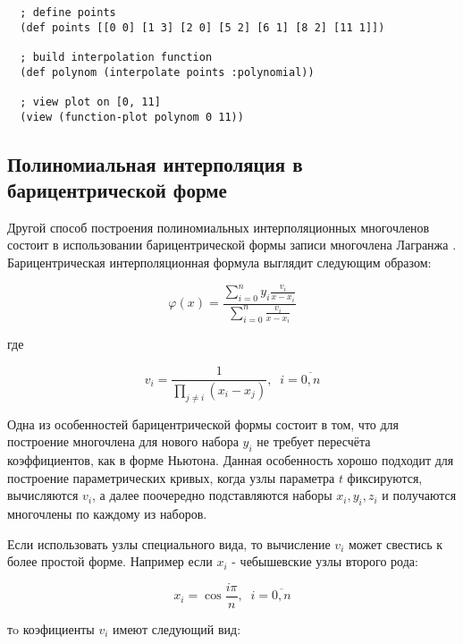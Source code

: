 \begin{verbatim}
  ; define points
  (def points [[0 0] [1 3] [2 0] [5 2] [6 1] [8 2] [11 1]])

  ; build interpolation function
  (def polynom (interpolate points :polynomial))

  ; view plot on [0, 11]
  (view (function-plot polynom 0 11))
\end{verbatim}




\subsection{Полиномиальная интерполяция в барицентрической форме}

Другой способ построения полиномиальных интерполяционных многочленов состоит в использовании барицентрической формы записи многочлена Лагранжа \cite{berrut2004}. Барицентрическая интерполяционная формула выглядит следующим образом:

\begin{equation}
  \varphi(x) = \frac
  {\sum\limits_{i=0}^n y_i \frac{v_i}{x - x_i}}
  {\sum\limits_{i=0}^n \frac{v_i}{x - x_i}}
\end{equation}

\noindent где

\begin{equation}
  v_i = \frac{1}{\prod_{j \neq i}(x_i - x_j)}, \;\; i = \overline{0,n}
\end{equation}

Одна из особенностей барицентрической формы состоит в том, что для построение многочлена для нового набора ${y_i}$ не требует пересчёта коэффициентов, как в форме Ньютона. Данная особенность хорошо подходит для построение параметрических кривых, когда узлы параметра $t$ фиксируются, вычисляются $v_i$, а далее поочередно подставляются наборы ${x_i}, {y_i}, {z_i}$ и получаются многочлены по каждому из наборов.

Если использовать узлы специального вида, то вычисление $v_i$ может свестись к более простой форме. Например если $x_i$ - чебышевские узлы второго рода:

\begin{equation}
  x_i = \cos \frac{i \pi}{n}, \;\; i = \overline{0, n}
\end{equation}

\noindent тo коэфициенты $v_i$ имеют следующий вид:

